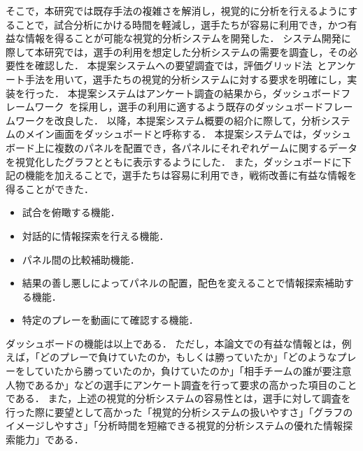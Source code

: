 \documentclass[sotsuron]{kuee}
\begin{document}
	そこで，本研究では既存手法の複雑さを解消し，視覚的に分析を行えるようにすることで，試合分析にかける時間を軽減し，選手たちが容易に利用でき，かつ有益な情報を得ることが可能な視覚的分析システムを開発した．
	システム開発に際して本研究では，選手の利用を想定した分析システムの需要を調査し，その必要性を確認した．
	本提案システムへの要望調査では，評価グリッド法~\cite{EGM}とアンケート手法を用いて，選手たちの視覚的分析システムに対する要求を明確にし，実装を行った．
	本提案システムはアンケート調査の結果から，ダッシュボードフレームワーク~\cite{dashboard}を採用し，選手の利用に適するよう既存のダッシュボードフレームワークを改良した．
	以降，本提案システム概要の紹介に際して，分析システムのメイン画面をダッシュボードと呼称する．
	本提案システムでは，ダッシュボード上に複数のパネルを配置でき，各パネルにそれぞれゲームに関するデータを視覚化したグラフとともに表示するようにした．
	また，ダッシュボードに下記の機能を加えることで，選手たちは容易に利用でき，戦術改善に有益な情報を得ることができた．
		\begin{itemize}
			\item 試合を俯瞰する機能．
			\item 対話的に情報探索を行える機能．
			\item パネル間の比較補助機能．
			\item 結果の善し悪しによってパネルの配置，配色を変えることで情報探索補助する機能．
			\item 特定のプレーを動画にて確認する機能．
		\end{itemize}
	ダッシュボードの機能は以上である．
	ただし，本論文での有益な情報とは，例えば，「どのプレーで負けていたのか，もしくは勝っていたか」「どのようなプレーをしていたから勝っていたのか，負けていたのか」「相手チームの誰が要注意人物であるか」などの選手にアンケート調査を行って要求の高かった項目のことである．
	また，上述の視覚的分析システムの容易性とは，選手に対して調査を行った際に要望として高かった「視覚的分析システムの扱いやすさ」「グラフのイメージしやすさ」「分析時間を短縮できる視覚的分析システムの優れた情報探索能力」である．
	
\end{document}
